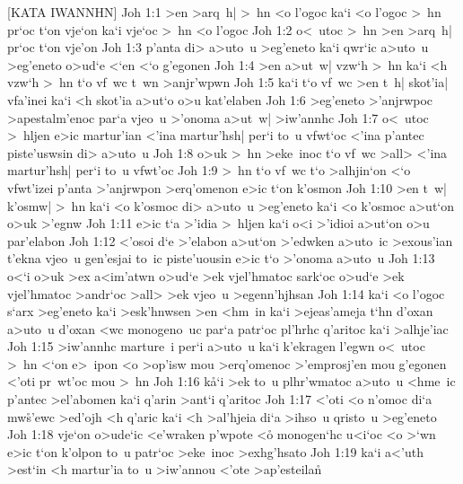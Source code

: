 [KATA IWANNHN]
\vs Joh 1:1
>en
>arq~h|
>~hn
<o
l'ogoc
ka`i
<o
l'ogoc
>~hn
pr`oc
t`on
vje`on
ka`i
vje`oc
>~hn
<o
l'ogoc\bibvsend
\vs Joh 1:2
o<~utoc
>~hn
>en
>arq~h|
pr`oc
t`on
vje'on\bibvsend
\vs Joh 1:3
p'anta
di>
a>uto~u
>eg'eneto
ka`i
qwr`ic
a>uto~u
>eg'eneto
o>ud`e
<`en
<`o
g'egonen\bibvsend
\vs Joh 1:4
>en
a>ut~w|
vzw`h
>~hn
ka`i
<h
vzw`h
>~hn
t`o
vf~wc
t~wn
>anjr'wpwn\bibvsend
\vs Joh 1:5
ka`i
t`o
vf~wc
>en
t~h|
skot'ia|
vfa'inei
ka`i
<h
skot'ia
a>ut`o
o>u
kat'elaben\bibvsend
\vs Joh 1:6
>eg'eneto
>'anjrwpoc
>apestalm'enoc
par`a
vjeo~u
>'onoma
a>ut~w|
>iw'annhc\bibvsend
\vs Joh 1:7
o<~utoc
>~hljen
e>ic
martur'ian
<'ina
martur'hsh|
per`i
to~u
vfwt`oc
<'ina
p'antec
piste'uswsin
di>
a>uto~u\bibvsend
\vs Joh 1:8
o>uk
>~hn
>eke~inoc
t`o
vf~wc
>all>
<'ina
martur'hsh|
per`i
to~u
vfwt'oc\bibvsend
\vs Joh 1:9
>~hn
t`o
vf~wc
t`o
>alhjin`on
<`o
vfwt'izei
p'anta
>'anjrwpon
>erq'omenon
e>ic
t`on
k'osmon\bibvsend
\vs Joh 1:10
>en
t~w|
k'osmw|
>~hn
ka`i
<o
k'osmoc
di>
a>uto~u
>eg'eneto
ka`i
<o
k'osmoc
a>ut`on
o>uk
>'egnw\bibvsend
\vs Joh 1:11
e>ic
t`a
>'idia
>~hljen
ka`i
o<i
>'idioi
a>ut`on
o>u
par'elabon\bibvsend
\vs Joh 1:12
<'osoi
d`e
>'elabon
a>ut`on
>'edwken
a>uto~ic
>exous'ian
t'ekna
vjeo~u
gen'esjai
to~ic
piste'uousin
e>ic
t`o
>'onoma
a>uto~u\bibvsend
\vs Joh 1:13
o<`i
o>uk
>ex
a<im'atwn
o>ud`e
>ek
vjel'hmatoc
sark`oc
o>ud`e
>ek
vjel'hmatoc
>andr`oc
>all>
>ek
vjeo~u
>egenn'hjhsan\bibvsend
\vs Joh 1:14
ka`i
<o
l'ogoc
s`arx
>eg'eneto
ka`i
>esk'hnwsen
>en
<hm~in
ka`i
>ejeas'ameja
t`hn
d'oxan
a>uto~u
d'oxan
<wc
monogeno~uc
par`a
patr`oc
pl'hrhc
q'aritoc
ka`i
>alhje'iac\bibvsend
\vs Joh 1:15
>iw'annhc
marture~i
per`i
a>uto~u
ka`i
k'ekragen
l'egwn
o<~utoc
>~hn
<`on
e>~ipon
<o
>op'isw
mou
>erq'omenoc
>'emprosj'en
mou
g'egonen
<'oti
pr~wt'oc
mou
>~hn\bibvsend
\vs Joh 1:16
k\r{a}`i
>ek
to~u
plhr'wmatoc
a>uto~u
<hme~ic
p'antec
>el'abomen
ka`i
q'arin
>ant`i
q'aritoc\bibvsend
\vs Joh 1:17
<'oti
<o
n'omoc
di`a
mw\r{s}'ewc
>ed'ojh
<h
q'aric
ka`i
<h
>al'hjeia
di`a
>ihso~u
qristo~u
>eg'eneto\bibvsend
\vs Joh 1:18
vje`on
o>ude`ic
<e'wraken
p'wpote
<o\r{}
monogen`hc
u<i`oc
<o
>`wn
e>ic
t`on
k'olpon
to~u
patr`oc
>eke~inoc
>exhg'hsato\bibvsend
\vs Joh 1:19
ka`i
a<'uth
>est`in
<h
martur'ia
to~u
>iw'annou
<'ote
>ap'esteila\r{n}
